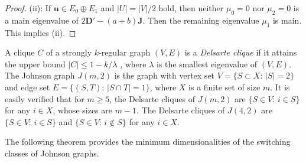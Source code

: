 \documentclass[a4paper, 11pt]{article}
\newcommand{\J}{\boldsymbol{J}}
\newcommand{\D}{\boldsymbol{D}}
\newcommand{\F}{\boldsymbol{F}}
\newcommand{\uv}{\boldsymbol{u}}
\newcommand{\el}{\boldsymbol{\ell}}
\theoremstyle{definition}
\begin{document}
\begin{proof}
(ii): If $\uv \in E_0 \oplus E_1$ and $|U|= |V|/2$ hold, then neither $\mu_0=0$ nor $\mu_2=0$ 
is a main eigenvalue of $2 \D'-(a+b)\J$. Then the remaining eigenvalue $\mu_1$ is main. 
This implies (ii). 
\end{proof}



A clique $C$ of a strongly $k$-regular graph $(V,E)$ is a {\it Delsarte clique} 
if it attains the upper bound $|C|\leq 1-k/\lambda$ \cite{D73}, where $\lambda$ is the smallest eigenvalue of $(V,E)$.  
The Johnson graph $J(m,2)$ is the graph with vertex set $V = \{ S \subset X \colon\, |S| = 2 \}$ and edge set $E = \{ (S,T) \colon\, |S \cap T| = 1 \}$, where $X$ is a finite set of size $m$.
It is easily verified that for $m\geq 5$, the Delsarte cliques of $J(m,2)$ are $\{S \in V \colon\, i \in S\}$ for any $i \in X$, whose sizes are $m-1$. 
The Delsarte cliques of $J(4,2)$ are $\{S \in V \colon\, i \in S\}$ and $\{S \in V \colon\, i \not\in S\}$ for any $i \in X$. 

The following theorem provides the minimum dimensionalities of the switching classes of Johnson graphs. 
\end{document}
